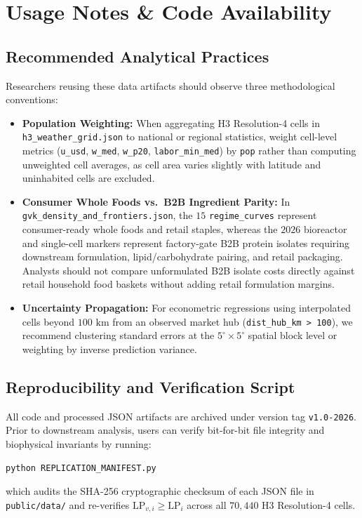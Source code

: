 \documentclass[11pt,a4paper]{article}
\begin{document}
\section{Usage Notes \& Code Availability}

\subsection{Recommended Analytical Practices}
Researchers reusing these data artifacts should observe three methodological conventions:
\begin{itemize}
    \item \textbf{Population Weighting:} When aggregating H3 Resolution-4 cells in \texttt{h3\_weather\_grid.json} to national or regional statistics, weight cell-level metrics (\texttt{u\_usd}, \texttt{w\_med}, \texttt{w\_p20}, \texttt{labor\_min\_med}) by \texttt{pop} rather than computing unweighted cell averages, as cell area varies slightly with latitude and uninhabited cells are excluded.
    \item \textbf{Consumer Whole Foods vs.\ B2B Ingredient Parity:} In \texttt{gvk\_density\_and\_frontiers.json}, the $15$ \texttt{regime\_curves} represent consumer-ready whole foods and retail staples, whereas the $2026$ bioreactor and single-cell markers represent factory-gate B2B protein isolates requiring downstream formulation, lipid/carbohydrate pairing, and retail packaging. Analysts should not compare unformulated B2B isolate costs directly against retail household food baskets without adding retail formulation margins.
    \item \textbf{Uncertainty Propagation:} For econometric regressions using interpolated cells beyond $100\text{ km}$ from an observed market hub (\texttt{dist\_hub\_km > 100}), we recommend clustering standard errors at the $5^\circ \times 5^\circ$ spatial block level or weighting by inverse prediction variance.
\end{itemize}

\subsection{Reproducibility and Verification Script}
All code and processed JSON artifacts are archived under version tag \texttt{v1.0-2026}. Prior to downstream analysis, users can verify bit-for-bit file integrity and biophysical invariants by running:
\begin{verbatim}
python REPLICATION_MANIFEST.py
\end{verbatim}
which audits the SHA-256 cryptographic checksum of each JSON file in \texttt{public/data/} and re-verifies $\text{LP}_{v,i} \ge \text{LP}_i$ across all $70{,}440$ H3 Resolution-4 cells.
\end{document}

